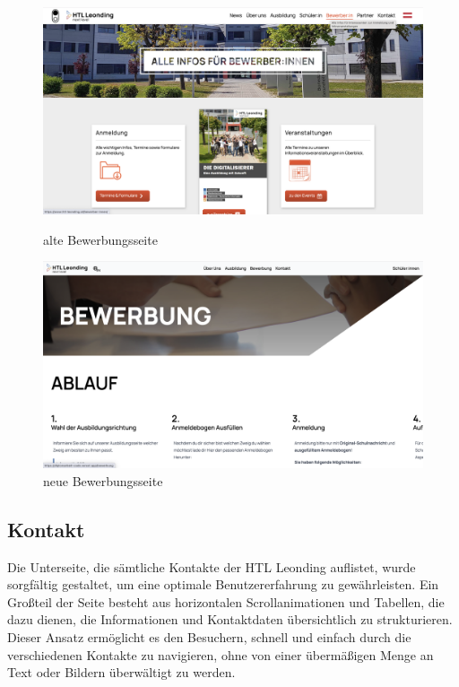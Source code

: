 \begin{figure}
   \begin{minipage}[b]{.4\linewidth} 
      \includegraphics[width=\linewidth]{pics/alt-bewerbung.png}
      \caption{alte Bewerbungsseite}
      \label{fig:impl:alt:bewerbung}
   \end{minipage}
   \hspace{.05\linewidth}
   \begin{minipage}[b]{.4\linewidth}
      \includegraphics[width=\linewidth]{pics/neu-bewerbung.png}
      \caption{neue Bewerbungsseite}
      \label{fig:impl:neu:bewerbung}
   \end{minipage}
\end{figure}

\subsection{Kontakt}

Die Unterseite, die sämtliche Kontakte der HTL Leonding auflistet, wurde sorgfältig gestaltet, um eine optimale Benutzererfahrung zu gewährleisten. Ein Großteil der Seite besteht aus horizontalen Scrollanimationen und Tabellen, die dazu dienen, die Informationen und Kontaktdaten übersichtlich zu strukturieren. Dieser Ansatz ermöglicht es den Besuchern, schnell und einfach durch die verschiedenen Kontakte zu navigieren, 
ohne von einer übermäßigen Menge an Text oder Bildern überwältigt zu werden.

